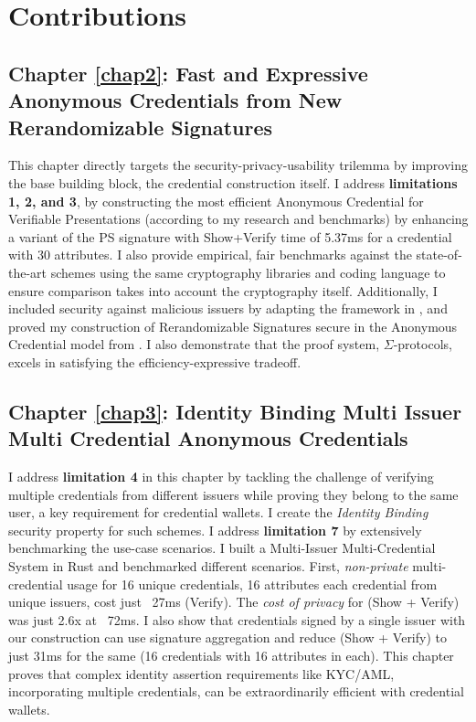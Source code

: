 \section{Contributions}

\subsection{Chapter \ref{chap2}: Fast and Expressive Anonymous Credentials from New Rerandomizable Signatures}
This chapter directly targets the security-privacy-usability trilemma by improving the base building block, the credential construction itself. I address \textbf{limitations 1, 2, and 3}, by constructing the most efficient Anonymous Credential for Verifiable Presentations (according to my research and benchmarks) by enhancing a variant \cite{tomescu_utt_2022} of the PS signature \cite{sako_short_2016} with Show+Verify time of 5.37ms for a credential with 30 attributes. I also provide empirical, fair benchmarks against the state-of-the-art schemes \cite{hutchison_constant-size_2006, camenisch_anonymous_2016, sako_short_2016, tomescu_utt_2022} using the same cryptography libraries and coding language to ensure comparison takes into account the cryptography itself. Additionally, I included security against malicious issuers by adapting the framework in \cite{fuchsbauer_structure-preserving_2019}, and proved my construction of Rerandomizable Signatures secure in the Anonymous Credential model from \cite{fuchsbauer_structure-preserving_2019}. I also demonstrate that the proof system, $\Sigma$-protocols, excels in satisfying the efficiency-expressive tradeoff. 


\subsection{Chapter \ref{chap3}: Identity Binding Multi Issuer Multi Credential Anonymous Credentials}
I address \textbf{limitation 4} in this chapter by tackling the challenge of verifying multiple credentials from different issuers while proving they belong to the same user, a key requirement for credential wallets. I create the \emph{Identity Binding} security property for such schemes. I address \textbf{limitation 7} by extensively benchmarking the use-case scenarios. I built a Multi-Issuer Multi-Credential System in Rust and benchmarked different scenarios. First, \emph{non-private} multi-credential usage for 16 unique credentials, 16 attributes each credential from unique issuers, cost just ~27ms (Verify). The \emph{cost of privacy} for (Show + Verify) was just 2.6x at ~72ms. I also show that credentials signed by a single issuer with our construction can use signature aggregation and reduce (Show + Verify) to just 31ms for the same (16 credentials with 16 attributes in each). This chapter proves that complex identity assertion requirements like KYC/AML, incorporating multiple credentials, can be extraordinarily efficient with credential wallets.


